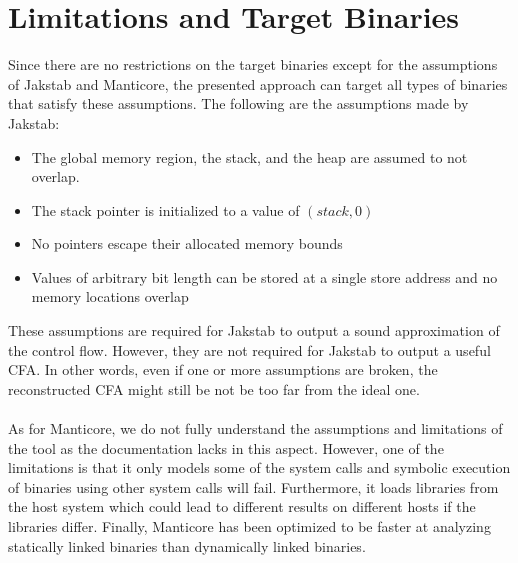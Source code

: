 \documentclass{kththesis}
\newcommand{\fbcomment}[1]{{#1}}
\renewcommand{\fbcomment}[1]{}
\begin{document}
\section{Limitations and Target Binaries}
\fbcomment{\color{red}Goal: Describe what assumptions are required for Jakstab and Manticore to work as expected.}
%
%
%
%
Since there are no restrictions on the target binaries except for the assumptions of Jakstab and Manticore, the presented approach can target all types of binaries that satisfy these assumptions. The following are the assumptions made by Jakstab:
\begin{itemize}
    \item The global memory region, the stack, and the heap are assumed to not overlap.
    \item The stack pointer is initialized to a value of $(stack,0)$
    \item No pointers escape their allocated memory bounds
    \item Values of arbitrary bit length can be stored at a single store address and no memory locations overlap
\end{itemize}
These assumptions are required for Jakstab to output a sound approximation of the control flow. However, they are not required for Jakstab to output a useful CFA. In other words, even if one or more assumptions are broken, the reconstructed CFA might still be not be too far from the ideal one. 
\\ \\
As for Manticore, we do not fully understand the assumptions and limitations of the tool as the documentation lacks in this aspect. However, one of the limitations is that it only models some of the system calls and symbolic execution of binaries using other system calls will fail\cite{feliam}. Furthermore, it loads libraries from the host system which could lead to different results on different hosts if the libraries differ\cite{feliam}. Finally, Manticore has been optimized to be faster at analyzing statically linked binaries than dynamically linked binaries\cite{feliam}. 
\end{document}
